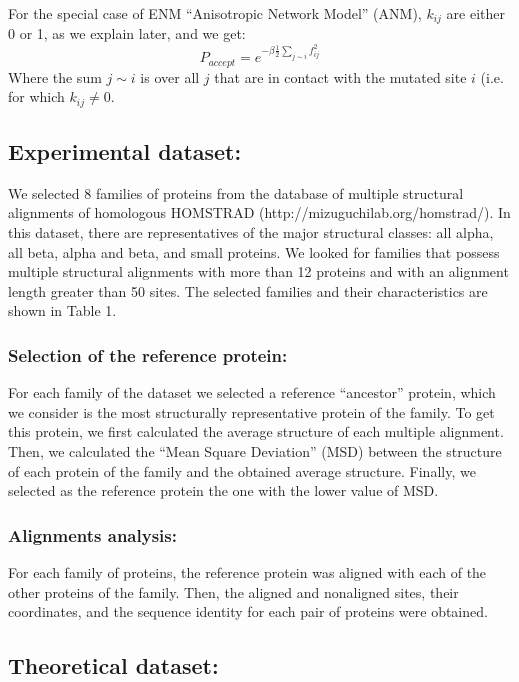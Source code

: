 \documentclass{article}
\begin{document}
\begin{multicols}{2}
{{For the special case of ENM ``Anisotropic Network Model'' (ANM), $k_{ij}$ are either 0 or 1, as we explain later, and we get:
\begin{equation} \label{eq:PacceptANM}
P_{accept} = e^{-\beta \frac{1}{2} \sum_{j\sim i}  f_{ij}^2}
\end{equation}
Where the sum $j \sim i$ is over all $j$ that are in contact with the mutated site $i$ (i.e. for which $k_{ij} \ne 0$.

\subsection*{Experimental dataset:}
We selected 8 families of proteins from the database of multiple structural alignments of homologous HOMSTRAD (http://mizuguchilab.org/homstrad/). In this dataset, there are representatives of the major structural classes: all alpha, all beta, alpha and beta, and small proteins. We looked for families that possess multiple structural alignments with more than 12 proteins and with an alignment length greater than 50 sites. The selected families and their characteristics are shown in Table 1.

\subsubsection*{Selection of the reference protein:}
For each family of the dataset we selected a reference ``ancestor'' protein, which we consider is the most structurally representative protein of the family. To get this protein, we first calculated the average structure of each multiple alignment. Then, we calculated the ``Mean Square Deviation'' (MSD) between the structure of each protein of the family and the obtained average structure. Finally, we selected as the reference protein the one with the lower value of MSD.

\subsubsection*{Alignments analysis:}
For each family of proteins, the reference protein was aligned with each of the other proteins of the family. Then, the aligned and nonaligned sites, their coordinates, and the sequence identity for each pair of proteins were obtained. 

\subsection*{Theoretical dataset:}

}}
\end{multicols}
\end{document}
